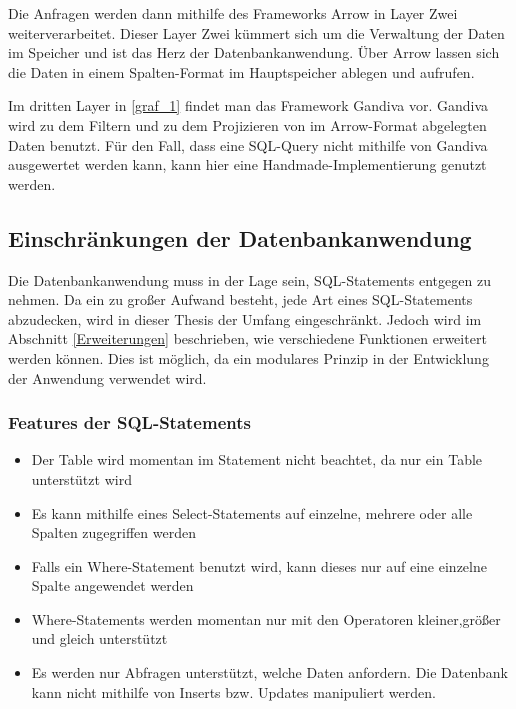 Die Anfragen werden dann mithilfe des Frameworks Arrow in Layer Zwei weiterverarbeitet. Dieser Layer Zwei kümmert sich um die Verwaltung der Daten im Speicher und ist das Herz der Datenbankanwendung. Über Arrow lassen sich die Daten in einem Spalten-Format im Hauptspeicher ablegen und aufrufen.

Im dritten Layer in \ref{graf_1} findet man das Framework Gandiva vor. 
Gandiva wird zu dem Filtern und zu dem Projizieren von im Arrow-Format abgelegten Daten benutzt. Für den Fall, dass eine SQL-Query nicht mithilfe von Gandiva ausgewertet werden kann, kann hier eine Handmade-Implementierung genutzt werden.

\subsection{Einschränkungen der Datenbankanwendung}

Die Datenbankanwendung muss in der Lage sein, SQL-Statements entgegen zu nehmen. Da ein zu großer Aufwand besteht, jede Art eines SQL-Statements abzudecken, wird in dieser Thesis der Umfang eingeschränkt. Jedoch wird im Abschnitt \ref{Erweiterungen} beschrieben, wie verschiedene Funktionen erweitert werden können. Dies ist möglich, da ein modulares Prinzip in der Entwicklung der Anwendung verwendet wird.

\subsubsection{Features der SQL-Statements}

\begin{itemize}
\item Der Table wird momentan im Statement nicht beachtet, da nur ein Table unterstützt wird 
 \item Es kann mithilfe eines Select-Statements auf einzelne, mehrere oder alle Spalten zugegriffen werden
 \item Falls ein Where-Statement benutzt wird, kann dieses nur auf eine einzelne Spalte angewendet werden
 \item Where-Statements werden momentan nur mit den Operatoren kleiner,größer und gleich unterstützt
 \item Es werden nur Abfragen unterstützt, welche Daten anfordern. Die Datenbank kann nicht mithilfe von Inserts bzw. Updates manipuliert werden.
\end{itemize}

